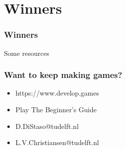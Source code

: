 \documentclass{beamer}
\begin{document}
\section{Winners}
\begin{frame}
\frametitle{Winners}
\begin{figure}

\end{figure}
\end{frame}

\begin{frame}
Some resources
\frametitle{Want to keep making games?}
\begin{itemize}
    \item https://www.develop.games
    \item Play The Beginner's Guide
    \item D.DiStaso@tudelft.nl
    \item L.V.Christiansen@tudelft.nl
\end{itemize}
\end{frame}
\end{document}
